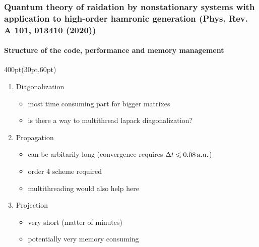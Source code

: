 \begin{frame}
\frametitle{Quantum theory of raidation by nonstationary systems 
	with application to high-order hamronic generation
        (Phys. Rev. A 101, 013410 (2020))}
	\framesubtitle{Structure of the code, performance 
         and memory management}
\small

\begin{textblock*}{400pt}(30pt,60pt)
\footnotesize
\begin{enumerate}
\item Diagonalization
\begin{itemize}
\footnotesize
\item[$\bullet$] most time consuming part for bigger matrixes
\item[$\bullet$] is there a way to multithread lapack diagonalization? 
\end{itemize}
\item Propagation
\begin{itemize}
\footnotesize
\item[$\bullet$] can be arbitarily long 
(convergence requires $\Delta t \leqslant 0.08\,\rm a.u.$)
\item[$\bullet$] order 4 scheme required
\item[$\bullet$] multithreading would also help here
\end{itemize}
\item Projection 
\begin{itemize}
\footnotesize
\item[$\bullet$] very short (matter of minutes)
\item[$\bullet$] potentially very memory consuming
\end{itemize}
\end{enumerate}

\end{textblock*}

\end{frame}


